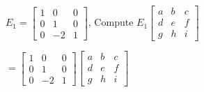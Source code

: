 \documentclass{report}
\begin{document}
\begin{example}
$E_1=
\begin{bmatrix}
1 & 0 & 0 \\
0 & 1 & 0 \\
0 & -2 & 1
\end{bmatrix}$,
Compute $E_1
\begin{bmatrix}
a & b & c \\
d & e & f \\
g & h & i
\end{bmatrix}$\\\vspace{2mm}

$=
\begin{bmatrix}
	1 & 0 & 0 \\
	0 & 1 & 0 \\
	0 & -2 & 1
\end{bmatrix}
\begin{bmatrix}
	a & b & c \\
	d & e & f \\
	g & h & i
\end{bmatrix}$\\\vspace{2mm}


\end{example}
\end{document}

